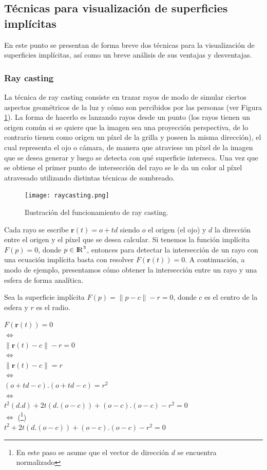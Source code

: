\documentclass[12pt]{article}
\begin{document}
\subsection{Técnicas para visualización de superficies implícitas}
En este punto se presentan de forma breve dos técnicas para la visualización de superficies implícitas, así como un breve análisis de sus ventajas y desventajas.
\subsubsection{Ray casting}
La técnica de ray casting consiste en trazar rayos de modo de simular ciertos aspectos geométricos de la luz y cómo son percibidos por las personas (ver Figura \ref{raycasting}). La forma de hacerlo es lanzando rayos desde un punto (los rayos tienen un origen común si se quiere que la imagen sea una proyección perspectiva, de lo contrario tienen como origen un píxel de la grilla y poseen la misma dirección), el cual representa el ojo o cámara, de manera que atraviese un píxel de la imagen que se desea generar y luego se detecta con qué superficie interseca. Una vez que se obtiene el primer punto de intersección del rayo se le da un color al píxel atravesado utilizando distintas técnicas de sombreado.
\begin{figure}[h!]
\texttt{[image: raycasting.png]}
\caption{Ilustración del funcionamiento de ray casting.}
\label{raycasting}
\end{figure}

Cada rayo se escribe $\textbf{r}(t)= o +td$ siendo $o$ el origen (el ojo) y $d$ la dirección entre el origen y el píxel que se desea calcular. Si tenemos la función implícita $F(p)=0$, donde $p \in {\rm I\!R} ^3 $, entonces para detectar la intersección de un rayo con una ecuación implícita basta con resolver $F(\textbf{r}(t))=0$.
A continuación, a modo de ejemplo, presentamos cómo obtener la intersección entre un rayo y una esfera de forma analítica\cite{realtimerendering}.

Sea la superficie implícita $F(p)=\lVert p -c \rVert - r = 0$, donde $c$ es el centro de la esfera y $r$ es el radio.
\begin{center}
$ F(\textbf{r}(t))= 0$
\\$ \iff$
\\$ \lVert \textbf{r}(t) -c \rVert - r = 0$
\\$ \iff$
\\$ \lVert \textbf{r}(t) -c \rVert = r$
\\ $\iff$
\\ $(o+td -c).(o+td -c) = r^2 $ 
\\ $\iff$
\\$t^2(d.d) + 2t(d.(o-c)) + (o-c).(o-c) - r^2=0$
\\ $\iff$ (\footnote{En este paso se asume que el vector de dirección $d$ se encuentra normalizado})
\\$t^2 + 2t(d.(o-c)) + (o-c).(o-c) - r^2=0$
\end{center}
\end{document}
